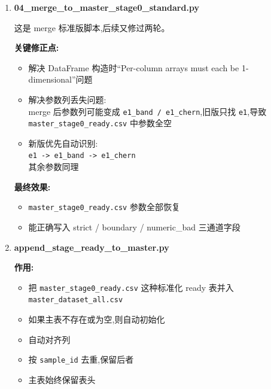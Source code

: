\documentclass[lang=cn,scheme=chinese,color=blue,device=normal,toc=onecol,math=cm]{elegantbook}
\begin{document}
\begin{enumerate}
\textbf{输出目录:}\par
 
\begin{itemize}
\item \texttt{chern\_\allowbreak{}output\_\allowbreak{}stage0\_\allowbreak{}global\_\allowbreak{}random\_\allowbreak{}dualchannel/\allowbreak{}}
\end{itemize}
\item \textbf{04\_\allowbreak{}merge\_\allowbreak{}to\_\allowbreak{}master\_\allowbreak{}stage0\_\allowbreak{}standard.py}\par
 
这是 merge 标准版脚本,后续又修过两轮。\par
 
\textbf{关键修正点:}\par
 
\begin{itemize}
\item 解决 DataFrame 构造时“Per-column arrays must each be 1-dimensional”问题
\item 解决参数列丢失问题:\\ merge 后参数列可能变成 \texttt{e1\_\allowbreak{}band /\allowbreak{} e1\_\allowbreak{}chern},旧版只找 \texttt{e1},导致 \texttt{master\_\allowbreak{}stage0\_\allowbreak{}ready.csv} 中参数全空
\item 新版优先自动识别:\\ \texttt{e1 -> e1\_\allowbreak{}band -> e1\_\allowbreak{}chern}\\ 其余参数同理
\end{itemize}
 
\textbf{最终效果:}\par
 
\begin{itemize}
\item \texttt{master\_\allowbreak{}stage0\_\allowbreak{}ready.csv} 参数全部恢复
\item 能正确写入 strict /\allowbreak{} boundary /\allowbreak{} numeric\_\allowbreak{}bad 三通道字段
\end{itemize}
\item \textbf{append\_\allowbreak{}stage\_\allowbreak{}ready\_\allowbreak{}to\_\allowbreak{}master.py}\par
 
\textbf{作用:}\par
 
\begin{itemize}
\item 把 \texttt{master\_\allowbreak{}stage0\_\allowbreak{}ready.csv} 这种标准化 ready 表并入 \texttt{master\_\allowbreak{}dataset\_\allowbreak{}all.csv}
\item 如果主表不存在或为空,则自动初始化
\item 自动对齐列
\item 按 \texttt{sample\_\allowbreak{}id} 去重,保留后者
\item 主表始终保留表头
\end{itemize}
 

\end{enumerate}
\end{document}
